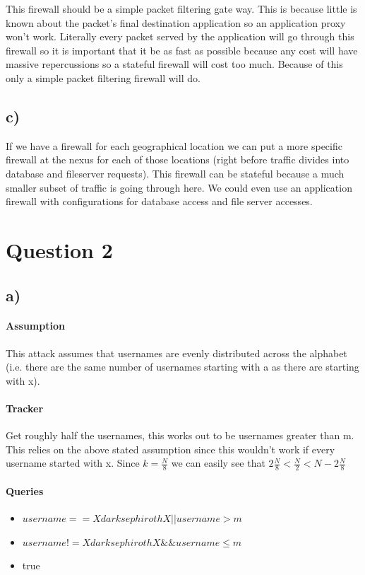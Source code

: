 \documentclass{article}
\begin{document}
This firewall should be a simple packet filtering gate way. This is because little is known about the packet's final destination application so an application proxy won't work. Literally every packet served by the application will go through this firewall so it is important that it be as fast as possible because any cost will have massive repercussions so a stateful firewall will cost too much. Because of this only a simple packet filtering firewall will do.

\subsection*{c)}
\label{sub:c_}
If we have a firewall for each geographical location we can put a more specific firewall at the nexus for each of those locations (right before traffic divides into database and fileserver requests). This firewall can be stateful because a much smaller subset of traffic is going through here. We could even use an application firewall with configurations for database access and file server accesses.

\section*{Question 2}
\label{sec:question_2}
\subsection*{a)}
\label{sub:a_}
\paragraph{Assumption}
\label{par:assumption}
This attack assumes that usernames are evenly distributed across the alphabet (i.e. there are the same number of usernames starting with a as there are starting with x).
\paragraph{Tracker}
\label{par:tracker}
Get roughly half the usernames, this works out to be usernames greater than m. This relies on the above stated assumption since this wouldn't work if every username started with x. Since $k = \frac{N}{8}$ we can easily see that $2 \frac{N}{8} < \frac{N}{2} < N - 2 \frac{N}{8}$
\paragraph{Queries}
\label{par:queries}
\begin{itemize}
	\item $username == XdarksephirothX || username > m$
	\item $username != XdarksephirothX \&\& username \leq m$
	\item true
\end{itemize}
\end{document}
